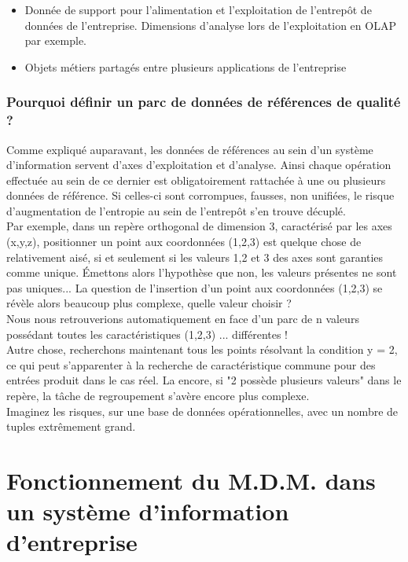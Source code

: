 \begin{itemize}
\item Donnée de support pour l'alimentation et l'exploitation de l'entrepôt de données de l'entreprise. Dimensions d'analyse lors de l'exploitation en OLAP par exemple.
\item Objets métiers partagés entre plusieurs applications de l'entreprise
\end{itemize}


\subsubsection{Pourquoi définir un parc de données de références de qualité ?}

Comme expliqué auparavant, les données de références au sein d'un système d'information servent d'axes d'exploitation et d'analyse. Ainsi chaque opération effectuée au sein de ce dernier est obligatoirement rattachée à une ou plusieurs données de référence. Si celles-ci sont corrompues, fausses, non unifiées, le risque d'augmentation de l'entropie au sein de l'entrepôt s'en trouve décuplé.\\
Par exemple, dans un repère orthogonal de dimension 3, caractérisé par les axes (x,y,z), positionner un point aux coordonnées (1,2,3) est quelque chose de relativement aisé, si et seulement si les valeurs 1,2 et 3 des axes sont garanties comme unique.
Émettons alors l'hypothèse que non, les valeurs présentes ne sont pas uniques... La question de l'insertion d'un point aux coordonnées (1,2,3) se révèle alors beaucoup plus complexe, quelle valeur choisir ? \\ 
Nous nous retrouverions automatiquement en face d'un parc de n valeurs possédant toutes les caractéristiques (1,2,3) ... différentes !\\
Autre chose, recherchons maintenant tous les points résolvant la condition y = 2, ce qui peut s'apparenter à la recherche de caractéristique commune pour des entrées produit dans le cas réel.
La encore, si "2 possède plusieurs valeurs" dans le repère, la tâche de regroupement s'avère encore plus complexe.\\
Imaginez les risques, sur une base de données opérationnelles, avec un nombre de tuples extrêmement grand.\\

\section{Fonctionnement du M.D.M. dans un système d'information d'entreprise}


